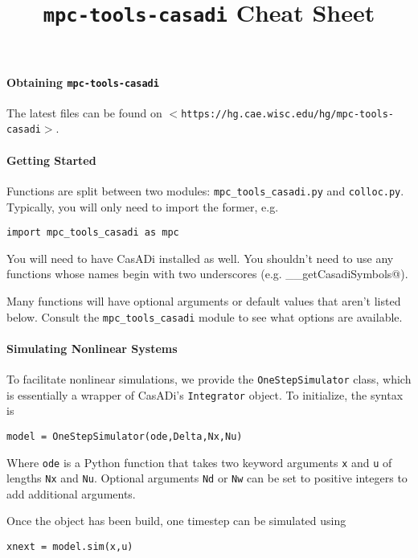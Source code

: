 \documentclass[twocolumn]{article}
\title{\texttt{mpc-tools-casadi} Cheat Sheet}
\newcommand{\smallurl}[1]{\texttt{\scriptsize$<$#1$>$}}
\newcommand{\casadi}{CasADi}
\begin{document}
\pagestyle{empty}
\maketitle

\thispagestyle{empty}

\paragraph*{Obtaining \texttt{mpc-tools-casadi}}

The latest files can be found on \smallurl{https://hg.cae.wisc.edu/hg/mpc-tools-casadi}.

\paragraph*{Getting Started}

Functions are split between two modules: \texttt{mpc\_tools\_casadi.py} and \texttt{colloc.py}.
Typically, you will only need to import the former, e.g.
%
\begin{lstlisting}[style=python]
import mpc_tools_casadi as mpc
\end{lstlisting}
%
You will need to have \casadi{} installed as well.
You shouldn't need to use any functions whose names begin with two underscores (e.g. \lstinline@__getCasadiSymbols@). 

Many functions will have optional arguments or default values that aren't listed below.
Consult the \texttt{mpc\_tools\_casadi} module to see what options are available.

\paragraph*{Simulating Nonlinear Systems}

To facilitate nonlinear simulations, we provide the \texttt{OneStepSimulator} class, which is essentially a wrapper of \casadi's \texttt{Integrator} object.
To initialize, the syntax is
%
\begin{lstlisting}
model = OneStepSimulator(ode,Delta,Nx,Nu)
\end{lstlisting}
%
Where \texttt{ode} is a Python function that takes two keyword arguments \texttt{x} and \texttt{u} of lengths \texttt{Nx} and \texttt{Nu}.
Optional arguments \texttt{Nd} or \texttt{Nw} can be set to positive integers to add additional arguments.

Once the object has been build, one timestep can be simulated using
\begin{lstlisting}
xnext = model.sim(x,u)
\end{lstlisting}
\end{document}
